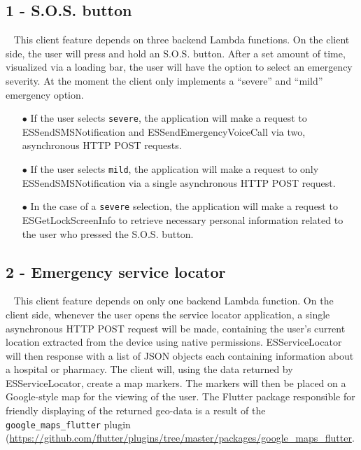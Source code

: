 \documentclass[10pt, a4paper]{article}
\begin{document}
\subsection{1 - S.O.S. button} 
\par ~ This client feature depends on three backend Lambda functions. On the client side, the user will press and hold an S.O.S. button. After a set amount of time, visualized via a loading bar, the user will have the option to select an emergency severity. At the moment the client only implements a ``severe'' and ``mild'' emergency option.
	\begin{itemize}
		\item[$\bullet$] If the user selects \texttt{severe}, the application will make a request to ESSendSMSNotification and ESSendEmergencyVoiceCall via two, asynchronous HTTP POST requests.
		\item[$\bullet$] If the user selects \texttt{mild}, the application will make a request to only ESSendSMSNotification via a single asynchronous HTTP POST request. 
		\item[$\bullet$] In the case of a \texttt{severe} selection, the application will make a request to ESGetLockScreenInfo to retrieve necessary personal information related to the user who pressed the S.O.S. button. 
	\end{itemize}

\subsection{2 - Emergency service locator}
\par ~ This client feature depends on only one backend Lambda function. On the client side, whenever the user opens the service locator application, a single asynchronous HTTP POST request will be made, containing the user's current location extracted from the device using native permissions. ESServiceLocator will then response with a list of JSON objects each containing information about a hospital or pharmacy. The client will, using the data returned by ESServiceLocator, create a map markers. The markers will then be placed on a Google-style map for the viewing of the user. The Flutter package responsible for friendly displaying of the returned geo-data is a result of the \texttt{google\_maps\_flutter} plugin (\url{https://github.com/flutter/plugins/tree/master/packages/google\_maps\_flutter}.
\end{document}
